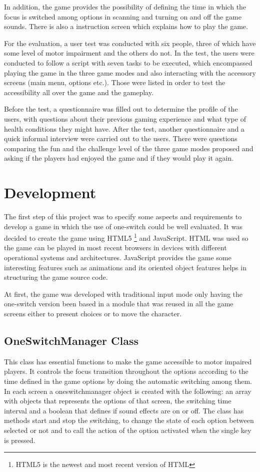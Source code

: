 \documentclass[a4paper]{sbgames}               %
\begin{document}
In addition, the game provides the possibility of defining the time in which the focus is switched among options in scanning and turning on and off the game sounds. There is also a instruction screen which explains how to play the game.

For the evaluation, a user test was conducted with six people, three of which have some level of motor impairment and the others do not. In the test, the users were conducted to follow a script with seven tasks to be executed, which encompassed playing the game in the three game modes and also interacting with the accessory screens (main menu, options etc.). Those were listed in order to test the accessibility all over the game and the gameplay.

Before the test, a questionnaire was filled out to determine the profile of the users, with questions about their previous gaming experience and what type of health conditions they might have. After the test, another questionnaire and a quick informal interview were carried out to the users. There were questions comparing the fun and the challenge level of the three game modes proposed and asking if the players had enjoyed the game and if they would play it again.

\section{Development}
\label{sec:development}
The first step of this project was to specify some aspects and requirements to develop a game in which the use of one-switch could be well evaluated. It was decided to create the game using HTML5 \footnote{HTML5 is the newest and most recent version of HTML} and JavaScript. HTML was used so the game can be played in most recent browsers in devices with different operational systems and architectures. JavaScript provides the game some interesting features such as animations and its oriented object features helps in structuring the game source code.

At first, the game was developed with traditional input mode only having the one-switch version been based in a module that was reused in all the game screens either to present choices or to move the character.

\subsection{OneSwitchManager Class}
\label{sec:OneSwitchManagerClass}
This class has essential functions to make the game accessible to motor impaired players. It controls the focus transition throughout the options according to the time defined in the game options by doing the automatic switching among them. In each screen a oneswitchmanager object is created with the following: an array with objects that represents the options of that screen, the switching time interval and a boolean that defines if sound effects are on or off. The class has methods start and stop the switching, to change the state of each option between selected or not and to call the action of the option activated when the single key is pressed.
\end{document}
